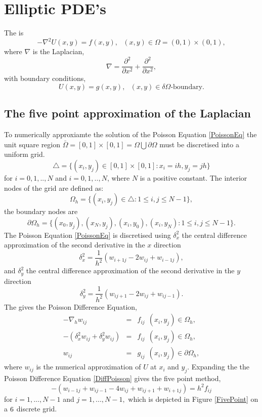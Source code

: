 \chapter{Elliptic PDE's}
The  is
\begin{equation}
-\nabla^2U(x,y)=f(x,y), \ \ \ (x,y) \in \Omega=(0,1)\times (0,1), \label{PoissonEq} \end{equation}
where $\nabla$ is the Laplacian,
\[ \nabla = \frac{\partial^2}{\partial x^2}+\frac{\partial^2}{\partial x^2}, \]
with boundary conditions,
\[U(x,y) = g(x,y), \ \ \  (x,y)\in\delta\Omega \text{-boundary.} \]
\section{The five point approximation of the Laplacian}
To numerically approxiamte the solution of the Poisson Equation \ref{PoissonEq} the  unit square region $\bar{\Omega}=[0,1]\times[0,1]=\Omega \bigcup \partial\Omega$ must be discretised into a uniform grid.
\[ \triangle = \{(x_i,y_j)\in [0,1]\times[0,1]:x_i=ih,y_j=jh \}\]
for $i=0,1,..,N$ and $i=0,1,..,N$, where $N$ is a positive constant.
The interior nodes of the grid are defined as:
\[ \Omega_h= \{(x_i,y_j)\in \triangle:1\leq i,j\leq N-1 \},\]
the boundary nodes are
\[ \partial\Omega_h= \{(x_0,y_j),(x_{N},y_j),(x_{i},y_0),(x_{i},y_N)
:1\leq i,j\leq N-1 \}.\]
The Poisson Equation \ref{PoissonEq} is discretised using 
$\delta_x^2$ the central difference approximation of the second derivative in the $x$ direction
\[\delta_x^2=\frac{1}{h^2}(w_{i+1j}-2w_{ij}+w_{i-1j}), \]
and $\delta_y^2$ the central difference approximation of the second derivative in the $y$ direction
\[\delta_y^2=\frac{1}{h^2}(w_{ij+1}-2w_{ij}+w_{ij-1}). \]
The gives the Poisson Difference Equation,
\begin{eqnarray}
-\nabla_h w_{ij}&=&f_{ij} \ \ (x_i,y_j) \in \Omega_h, \\
-(\delta_x^2w_{ij}+\delta_y^2w_{ij})&=&f_{ij} \ \ (x_i,y_j) \in \Omega_h, \\
w_{ij}&=&g_{ij} \ \ (x_i,y_j) \in \partial\Omega_h, \label{DiffPoisson}
\end{eqnarray}
where $w_{ij}$ is the numerical approximation of $U$ at $x_i$ and $y_j$.
Expanding the  the Poisson Difference Equation \ref{DiffPoisson} gives the five point method,
\[-(w_{i-1j}+w_{ij-1}-4w_{ij}+w_{ij+1}+w_{i+1j})=h^2f_{ij} \]
for $i=1,...,N-1$ and $j=1,...,N-1,$ which is depicted in Figure \ref{FivePoint} on a $6 \time 6$ discrete grid.

